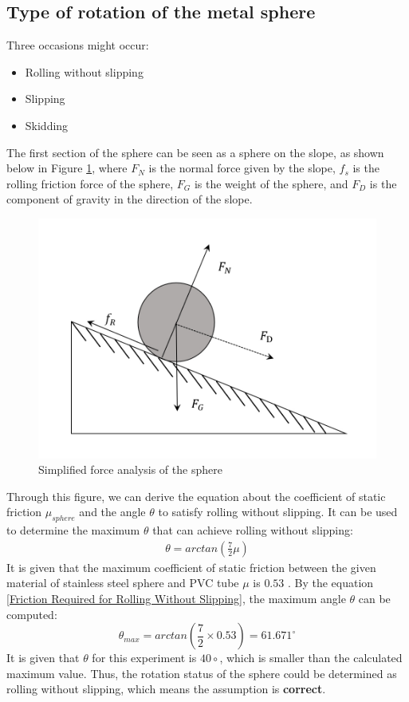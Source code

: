 \documentclass{article}
\begin{document}
    \subsection{Type of rotation of the metal sphere}
        Three occasions might occur:
        \begin{itemize}
            \item Rolling without slipping
            \item Slipping
            \item Skidding
        \end{itemize}
        The first section of the sphere can be seen as a sphere on the slope, as shown below in Figure \ref{simplevr}, where $F_N$ is the normal force given by the slope, $f_s$ is the rolling friction force of the sphere, $F_G$ is the weight of the sphere, and $F_D$ is the component of gravity in the direction of the slope.
        \begin{figure}[H]
            \centering
            \includegraphics[width=0.5\linewidth]{simplized_rolling_resistance.png}
            \caption{Simplified force analysis of the sphere}
            \label{simplevr}
        \end{figure}
        Through this figure, we can derive the equation about the coefficient of static friction $\mu_{sphere}$ and the angle $\theta$ to satisfy rolling without slipping. It can be used to determine the maximum $\theta$ that can achieve rolling without slipping:
        \begin{equation}\label{Friction Required for Rolling Without Slipping}
        \begin{aligned}
            \theta = arctan(\frac{7}{2}\mu)
        \end{aligned}
        \end{equation}
        It is given that the maximum coefficient of static friction between the given material of stainless steel sphere and PVC tube $\mu$ is $0.53$ \cite{MechGuru}. By the equation \ref{Friction Required for Rolling Without Slipping}, the maximum angle $\theta$ can be computed:
        \begin{equation}
            \theta_{max} = arctan(\frac{7}{2}\times0.53) = 61.671^\circ
        \end{equation}
        It is given that $\theta$ for this experiment is $40\circ$, which is smaller than the calculated maximum value. Thus, the rotation status of the sphere could be determined as rolling without slipping, which means the assumption is \textbf{correct}.
        
\end{document}
